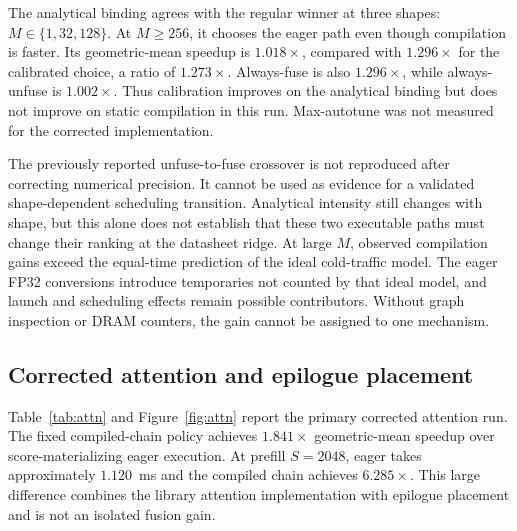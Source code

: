 \documentclass[a4paper,fleqn]{cas-dc}
\begin{document}
The analytical binding agrees with the regular winner at three shapes: $M \in \{1,32,128\}$.
At $M \ge 256$, it chooses the eager path even though compilation is faster.
Its geometric-mean speedup is $1.018\times$, compared with $1.296\times$ for the calibrated choice, a ratio of $1.273\times$.
Always-fuse is also $1.296\times$, while always-unfuse is $1.002\times$.
Thus calibration improves on the analytical binding but does not improve on static compilation in this run.
Max-autotune was not measured for the corrected implementation.

The previously reported unfuse-to-fuse crossover is not reproduced after correcting numerical precision.
It cannot be used as evidence for a validated shape-dependent scheduling transition.
Analytical intensity still changes with shape, but this alone does not establish that these two executable paths must change their ranking at the datasheet ridge.
At large $M$, observed compilation gains exceed the equal-time prediction of the ideal cold-traffic model.
The eager FP32 conversions introduce temporaries not counted by that ideal model, and launch and scheduling effects remain possible contributors.
Without graph inspection or DRAM counters, the gain cannot be assigned to one mechanism.

\subsection{Corrected attention and epilogue placement}
\label{sec:attn-eval}

Table~\ref{tab:attn} and Figure~\ref{fig:attn} report the primary corrected attention run.
The fixed compiled-chain policy achieves $1.841\times$ geometric-mean speedup over score-materializing eager execution.
At prefill $S{=}2048$, eager takes approximately $1.120$~ms and the compiled chain achieves $6.285\times$.
This large difference combines the library attention implementation with epilogue placement and is not an isolated fusion gain.
\end{document}

